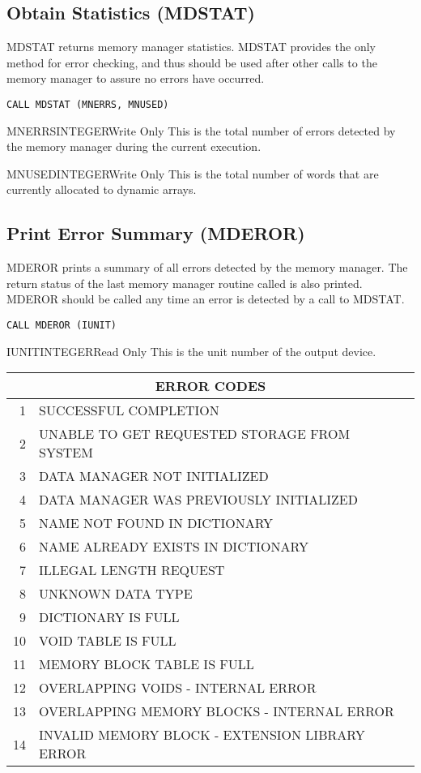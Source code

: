 \subsection{Obtain Statistics (MDSTAT)}
MDSTAT returns memory manager statistics.  MDSTAT provides the only method
for error checking, and thus should be used after other calls to the memory
manager to assure no errors have occurred.

\verb+CALL MDSTAT (MNERRS, MNUSED)+

\begin{argy}{MNERRS}{INTEGER}{Write Only}
This is the total number of errors detected by the memory manager during the
current execution.
\end{argy}

\begin{argy}{MNUSED}{INTEGER}{Write Only}
This is the total number of words that are currently allocated to dynamic
arrays.
\end{argy}

\subsection{Print Error Summary (MDEROR)}
MDEROR prints a summary of all errors detected by the memory manager.  The
return status of the last memory manager routine called is also printed.
MDEROR should be called any time an error is detected by a call to MDSTAT.

\verb+CALL MDEROR (IUNIT)+

\begin{argy}{IUNIT}{INTEGER}{Read Only}
This is the unit number of the output device.
\end{argy}

\begin{center}
\begin{tabular}{|rl|} \hline \hline
\multicolumn{2}{|c|}{ERROR CODES}\\ \hline
  1 &  SUCCESSFUL COMPLETION\\
  2 &  UNABLE TO GET REQUESTED STORAGE FROM SYSTEM\\
  3 &  DATA MANAGER NOT INITIALIZED\\
  4 &  DATA MANAGER WAS PREVIOUSLY INITIALIZED\\
  5 &  NAME NOT FOUND IN DICTIONARY\\
  6 &  NAME ALREADY EXISTS IN DICTIONARY\\
  7 &  ILLEGAL LENGTH REQUEST\\
  8 &  UNKNOWN DATA TYPE\\
  9 &  DICTIONARY IS FULL\\
 10 &  VOID TABLE IS FULL\\
 11 &  MEMORY BLOCK TABLE IS FULL\\
 12 &  OVERLAPPING VOIDS - INTERNAL ERROR\\
 13 &  OVERLAPPING MEMORY BLOCKS - INTERNAL ERROR\\
 14 &  INVALID MEMORY BLOCK - EXTENSION LIBRARY ERROR \\ \hline \hline
\end{tabular}
\end{center}

